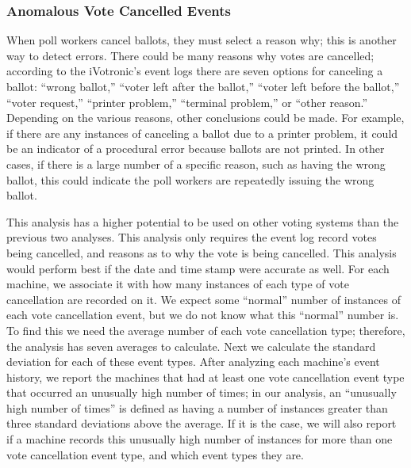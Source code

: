 \subsubsection{Anomalous Vote Cancelled Events}
When poll workers cancel ballots, they must select a reason why; this is another way to detect errors. There could be many reasons why votes are cancelled; according to the iVotronic’s event logs there are seven options for canceling a ballot: \textquotedblleft wrong ballot,\textquotedblright \hspace{1 mm} \textquotedblleft voter left after the ballot,\textquotedblright \hspace{1 mm}  \textquotedblleft voter left before the ballot,\textquotedblright \hspace{1 mm}  \textquotedblleft voter request,\textquotedblright \hspace{1 mm}  \textquotedblleft printer problem,\textquotedblright \hspace{1 mm}  \textquotedblleft terminal problem,\textquotedblright \hspace{1 mm}  or \textquotedblleft other reason.\textquotedblright \hspace{2 mm}  Depending on the various reasons, other conclusions could be made.  For example, if there are any instances of canceling a ballot due to a printer problem, it could be an indicator of a procedural error because ballots are not printed. In other cases, if there is a large number of a specific reason, such as having the wrong ballot, this could indicate the poll workers are repeatedly issuing the wrong ballot.  

This analysis has a higher potential to be used on other voting systems than the previous two analyses.  This analysis only requires the event log record votes being cancelled, and reasons as to why the vote is being cancelled.  This analysis would perform best if the date and time stamp were accurate as well.  For each machine, we associate it with how many instances of each type of vote cancellation are recorded on it.  We expect some “normal” number of instances of each vote cancellation event, but we do not know what this “normal” number is.  To find this we need the average number of each vote cancellation type; therefore, the analysis has seven averages to calculate.  Next we calculate the standard deviation for each of these event types.  After analyzing each machine’s event history, we report the machines that had at least one vote cancellation event type that occurred an unusually high number of times; in our analysis, an “unusually high number of times” is defined as having a number of instances greater than three standard deviations above the average.  If it is the case, we will also report if a machine records this unusually high number of instances for more than one vote cancellation event type, and which event types they are.  


